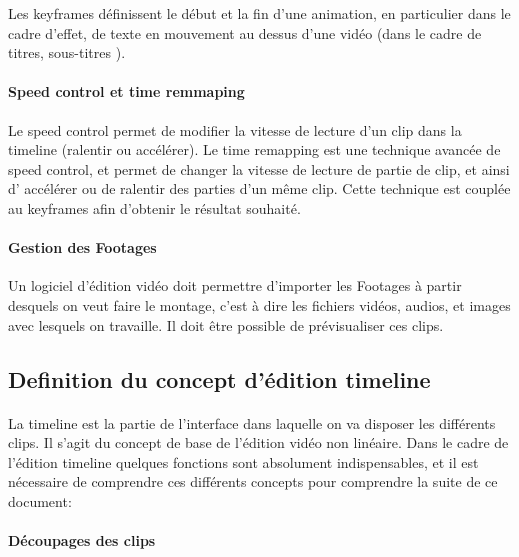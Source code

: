 Les keyframes définissent le début et la fin d'une animation, en
particulier dans le cadre d'effet, de texte en mouvement au dessus d'une
vidéo (dans le cadre de titres, sous-titres ).

\paragraph{Speed control et time remmaping}

Le speed control permet de modifier la vitesse de lecture d'un clip
dans la timeline (ralentir ou accélérer). Le time remapping est une
technique avancée de speed control, et permet de changer la vitesse de
lecture de partie de clip, et ainsi d' accélérer ou de ralentir des
parties d'un même clip. Cette technique est couplée au keyframes afin
d'obtenir le résultat souhaité.

\paragraph{Gestion des Footages}

Un logiciel d'édition vidéo doit permettre d'importer les Footages
 à partir desquels on veut faire le montage, c'est
à dire les fichiers vidéos, audios, et images avec lesquels on
travaille. Il doit être possible de prévisualiser ces clips.

\subsection{Definition du concept d'édition timeline}

\paragraph{}

La timeline est la partie de l'interface dans laquelle on va disposer
les différents clips. Il s'agit du concept de base de l'édition vidéo
non linéaire.  Dans le cadre de l'édition timeline quelques fonctions
sont absolument indispensables, et il est nécessaire de comprendre ces
différents concepts pour comprendre la suite de ce document:

\paragraph{Découpages des clips}

